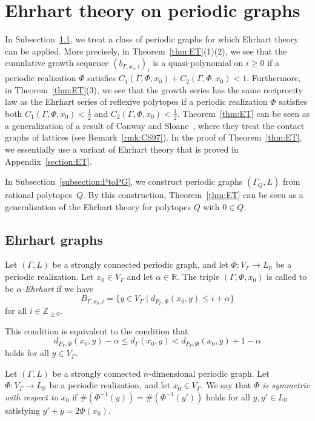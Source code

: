 \documentclass[ALCO,published]{cedram}
\theoremstyle{remark}
\begin{document}
\section{Ehrhart theory on periodic graphs}\label{section:ETP}
In Subsection~\ref{subsection:EG}, we treat a class of periodic graphs for which Ehrhart theory can be applied. 
More precisely, in Theorem~\ref{thm:ET}(1)(2), we see that the cumulative growth sequence $(b_{\Gamma, x_0, i})_i$ is a quasi-polynomial on $i \ge 0$ if a periodic realization $\Phi$ satisfies 
$C_1(\Gamma, \Phi, x_0) + C_2(\Gamma, \Phi, x_0) < 1$. 
Furthermore, in Theorem~\ref{thm:ET}(3), we see that the growth series has the same reciprocity law as the Ehrhart series of reflexive polytopes if a periodic realization $\Phi$ satisfies both $C_1(\Gamma, \Phi, x_0)< \frac{1}{2}$ and $C_2(\Gamma, \Phi, x_0) < \frac{1}{2}$. 
Theorem~\ref{thm:ET} can be seen as a generalization of a result of Conway and Sloane~\cite{CS97}, where they treat the contact graphs of lattices (see Remark~\ref{rmk:CS97}). 
In the proof of Theorem~\ref{thm:ET}, we essentially use a variant of Ehrhart theory that is proved in Appendix~\ref{section:ET}. 

In Subsection~\ref{subsection:PtoPG}, we construct periodic graphs $(\Gamma _Q, L)$ from rational polytopes~$Q$. By this construction, Theorem~\ref{thm:ET} can be seen as a generalization of the Ehrhart theory for polytopes $Q$ with $0 \in Q$. 

\subsection{Ehrhart graphs}\label{subsection:EG}
\begin{defi}
Let $(\Gamma , L)$ be a strongly connected periodic graph, 
and let $\Phi : V_{\Gamma} \to L_{\mathbb{R}}$ be a periodic realization. 
Let $x_0 \in V_{\Gamma}$ and let $\alpha \in \mathbb{R}$. 
The triple $(\Gamma, \Phi, x_0)$ is called to be \textit{$\alpha$-Ehrhart} if we have
\[
B_{\Gamma, x_0, i} = 
\{ y \in V_{\Gamma} \mid d_{P_{\Gamma}, \Phi} (x_0, y) \le i + \alpha \}
\]
for all $i \in \mathbb{Z}_{\ge 0}$. 

This condition is equivalent to the condition that 
\[
d_{P_{\Gamma}, \Phi} (x_0, y) - \alpha \le d_{\Gamma} (x_0, y)
< d_{P_{\Gamma}, \Phi} (x_0, y) + 1 - \alpha
\]
holds for all $y \in V_{\Gamma}$. 
\end{defi}

\begin{defi}
Let $(\Gamma , L)$ be a strongly connected $n$-dimensional periodic graph. 
Let~$\Phi : V_{\Gamma} \to L_{\mathbb{R}}$ be a periodic realization, and let $x_0 \in V_{\Gamma}$. 
We say that \textit{$\Phi$ is symmetric with respect to $x_0$} if 
$\#(\Phi ^{-1}(y)) = \#(\Phi ^{-1}(y'))$ holds for all $y, y' \in L_{\mathbb{R}}$ satisfying $y' + y = 2 \Phi(x_0)$. 
\end{defi}
\end{document}
